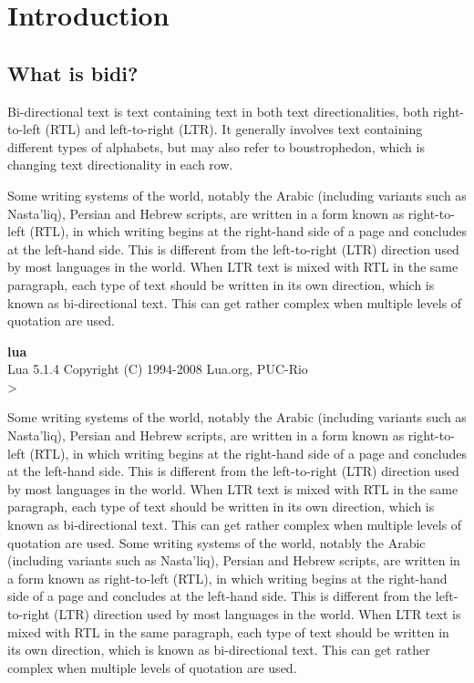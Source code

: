 \documentclass{luaprogramming-doc}
\begin{document}
\frontmatter
\thumbtabindex
\tableofcontents
{}

\clearpage
\mainmatter



\chapter{Introduction}
\enablethumbtabs
{}
\section{What is bidi?}
Bi-directional text is text containing text in both text directionalities, both right-to-left (RTL) and left-to-right (LTR). It generally involves text containing different types of alphabets, but may also refer to boustrophedon, which is changing text directionality in each row.

Some writing systems of the world, notably the Arabic (including variants such as Nasta'liq), Persian and Hebrew scripts, are written in a form known as right-to-left (RTL), in which writing begins at the right-hand side of a page and concludes at the left-hand side. This is different from the left-to-right (LTR) direction used by most languages in the world. When LTR text is mixed with RTL in the same paragraph, each type of text should be written in its own direction, which is known as bi-directional text. This can get rather complex when multiple levels of quotation are used.
\begin{definition}
\textbf{lua}\\
Lua 5.1.4  Copyright (C) 1994-2008 Lua.org, PUC-Rio\\
>
\end{definition}
Some writing systems of the world, notably the Arabic (including variants such as Nasta'liq), Persian and Hebrew scripts, are written in a form known as right-to-left (RTL), in which writing begins at the right-hand side of a page and concludes at the left-hand side. This is different from the left-to-right (LTR) direction used by most languages in the world. When LTR text is mixed with RTL in the same paragraph, each type of text should be written in its own direction, which is known as bi-directional text. This can get rather complex when multiple levels of quotation are used.
Some writing systems of the world, notably the Arabic (including variants such as Nasta'liq), Persian and Hebrew scripts, are written in a form known as right-to-left (RTL), in which writing begins at the right-hand side of a page and concludes at the left-hand side. This is different from the left-to-right (LTR) direction used by most languages in the world. When LTR text is mixed with RTL in the same paragraph, each type of text should be written in its own direction, which is known as bi-directional text. This can get rather complex when multiple levels of quotation are used.



\disablethumbtabs

\printindex


\clearpage
\mbox{}\clearpage
\end{document}
